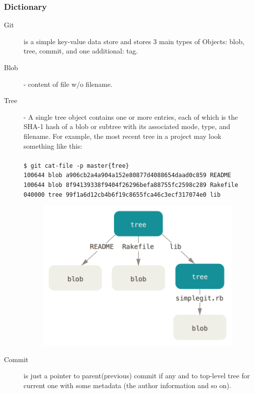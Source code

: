 \documentclass[12pt,oneside]{article}
\newcommand{\code}[1]{\texttt{#1}}
\begin{document}
\subsubsection{Dictionary}
\label{subsec:git-internals}
\begin{description}
  \item[Git] is a simple key-value data store and stores 3 main types of Objects: blob, tree, commit, and one additional: tag.
  \item[Blob] - content of file w/o filename.
  \item[Tree] - A single tree object contains one or more entries, each of which is the SHA-1 hash of a blob or subtree with its associated mode, type, and filename.
  For example, the most recent tree in a project may look something like this:\\
  \\
  \code{\$ git cat-file -p master\^\{tree\}}\\
  \code{100644 blob a906cb2a4a904a152e80877d4088654daad0c859      README}\\
  \code{100644 blob 8f94139338f9404f26296befa88755fc2598c289      Rakefile}\\
  \code{040000 tree 99f1a6d12cb4b6f19c8655fca46c3ecf317074e0      lib}
  \begin{figure}[H]
    \centering
    \includegraphics[width=\textwidth]{data-model-1.png}
    \label{fig:tree-objects}
  \end{figure}
  \item [Commit] is just a pointer to parent(previous) commit if any
  and to top-level tree for current one with some metadata
  (the author information and so on).

\end{description}
\end{document}
